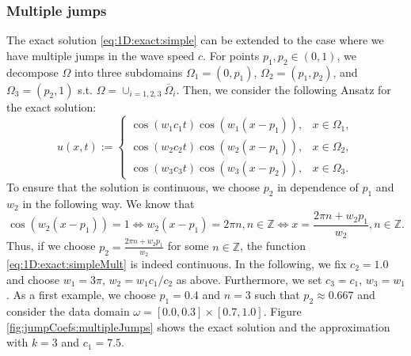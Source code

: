 \documentclass[sn-mathphys-num]{sn-jnl}
\numberwithin{equation}{section}
\begin{document}
\begin{comment}
                \addplot[gray, dashed, domain=1:4] {0.03*(1/2^(-2))^(x-0.9)};
                \addplot[gray, dashed, domain=1:4] {0.003*(1/2^(-2))^(x-0.9)};
                
    
                \legend{$k=2 \quad L = 4$, $k = 3 \quad L = 4$, $e^\Lambda$ (rescaled)}
            \end{groupplot}
        \end{tikzpicture}
    \end{center}
    \caption{Filippas lambda...}
  \end{figure}
\end{comment}



\subsubsection{Multiple jumps}
\noindent The exact solution \eqref{eq:1D:exact:simple} can be extended to the case where we have multiple jumps in the wave speed $c$. For points $p_1,p_2 \in (0,1)$, we decompose $\Omega$ into three subdomains $\Omega_1 = (0,p_1)$, $\Omega_2 = (p_1,p_2)$, and $\Omega_3 = (p_2,1)$ s.t. $\Omega = \cup_{i = 1,2,3} \overline{\Omega}_i$. Then, we consider the following Ansatz for the exact solution: 
\begin{equation}\label{eq:1D:exact:simpleMult}
    u(x,t) := \begin{cases}
        \cos(w_1 c_1 t) \cos(w_1(x-p_1)), & x \in \Omega_1, \\
        \cos(w_2 c_2 t) \cos(w_2(x-p_1)), & x \in \Omega_2, \\
        \cos(w_3 c_3 t) \cos(w_3(x-p_2)), & x \in \Omega_3. 
    \end{cases}
\end{equation}
To ensure that the solution is continuous, we choose $p_2$ in dependence of $p_1$ and $w_2$ in the following way. We know that 
\begin{equation*}
    \cos(w_2(x-p_1)) = 1 \Leftrightarrow w_2(x-p_1) = 2 \pi n, n \in \mathbb{Z} \Leftrightarrow x = \frac{2 \pi n + w_2 p_1}{w_2}, n \in \mathbb{Z}. 
\end{equation*}
Thus, if we choose $p_2 = \frac{2 \pi n + w_2 p_1}{w_2}$ for some $n \in \mathbb{Z}$, the function \eqref{eq:1D:exact:simpleMult} is indeed continuous.  
In the following, we fix $c_2 = 1.0$ and choose $w_1 = 3 \pi$, $w_2 = w_1 c_1/c_2$ as above. Furthermore, we set $c_3 = c_1$, $w_3 = w_1$. 
As a first example, we choose $p_1 = 0.4$ and $n = 3$ such that $p_2 \approx 0.667$ and consider the data domain $\omega = [0.0,0.3] \times [0.7,1.0]$. Figure \ref{fig:jumpCoefs:multipleJumps} shows the exact solution and the approximation with $k = 3$ and $c_1 = 7.5$.
\end{document}
